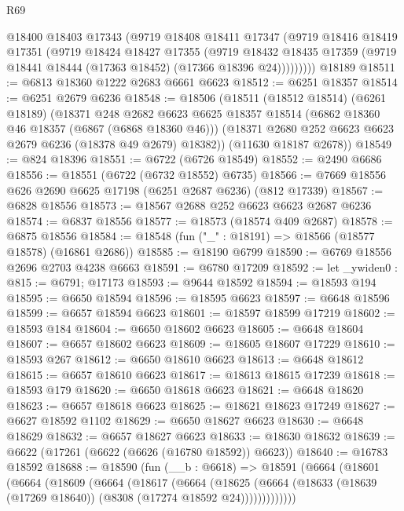 \begin{lexlean}{R69}
\begin{coremodule}
{          @18400
          @18403
          @17343
          (@9719
            @18408
            @18411
            @17347
            (@9719
              @18416
              @18419
              @17351
              (@9719
                @18424
                @18427
                @17355
                (@9719
                  @18432
                  @18435
                  @17359
                  (@9719 @18441 @18444 (@17363 @18452) (@17366 @18396 @24)))))))))
    @18189
@18511 := @6813 @18360 @1222 @2683 @6661 @6623
@18512 := @6251 @18357
@18514 := @6251 @2679 @6236
@18548 := @18506
    (@18511
      (@18512 @18514)
      (@6261 @18189)
      (@18371
        @248
        @2682
        @6623
        @6625
        @18357
        @18514
        (@6862 @18360 @46 @18357 (@6867 (@6868 @18360 @46)))
        (@18371 @2680 @252 @6623 @6623 @2679 @6236 (@18378 @49 @2679) @18382))
      (@11630 @18187 @2678))
@18549 := @824 @18396
@18551 := @6722 (@6726 @18549)
@18552 := @2490 @6686
@18556 := @18551 (@6722 (@6732 @18552) @6735)
@18566 := @7669 @18556 @626 @2690 @6625 @17198 (@6251 @2687 @6236) (@812 @17339)
@18567 := @6828 @18556
@18573 := @18567 @2688 @252 @6623 @6623 @2687 @6236
@18574 := @6837 @18556
@18577 := @18573 (@18574 @409 @2687)
@18578 := @6875 @18556
@18584 := @18548 (fun ("_" : @18191) => @18566 (@18577 @18578) (@16861 @2686))
@18585 := @18190 @6799
@18590 := @6769 @18556 @2696 @2703 @4238 @6663
@18591 := @6780 @17209
@18592 := let _ywiden0 : @815 := @6791; @17173
@18593 := @9644 @18592
@18594 := @18593 @194
@18595 := @6650 @18594
@18596 := @18595 @6623
@18597 := @6648 @18596
@18599 := @6657 @18594 @6623
@18601 := @18597 @18599 @17219
@18602 := @18593 @184
@18604 := @6650 @18602 @6623
@18605 := @6648 @18604
@18607 := @6657 @18602 @6623
@18609 := @18605 @18607 @17229
@18610 := @18593 @267
@18612 := @6650 @18610 @6623
@18613 := @6648 @18612
@18615 := @6657 @18610 @6623
@18617 := @18613 @18615 @17239
@18618 := @18593 @179
@18620 := @6650 @18618 @6623
@18621 := @6648 @18620
@18623 := @6657 @18618 @6623
@18625 := @18621 @18623 @17249
@18627 := @6627 @18592 @1102
@18629 := @6650 @18627 @6623
@18630 := @6648 @18629
@18632 := @6657 @18627 @6623
@18633 := @18630 @18632
@18639 := @6622 (@17261 (@6622 (@6626 (@16780 @18592)) @6623))
@18640 := @16783 @18592
@18688 := @18590
    (fun (__b : @6618) =>
    @18591
      (@6664
        (@18601
          (@6664
            (@18609
              (@6664
                (@18617
                  (@6664
                    (@18625
                      (@6664 (@18633 (@18639 (@17269 @18640)) (@8308 (@17274 @18592 @24)))))))))))))
}
\end{coremodule}
\end{lexlean}
